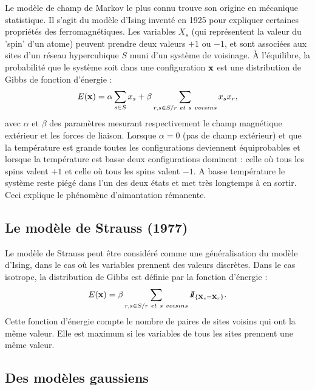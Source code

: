 

\begin{ex}
\cite{Billoire1992}
Le mod\`ele de champ de Markov le plus connu trouve son origine en
m\'ecanique statistique. Il s'agit du mod\`ele d'Ising invent\'e en 1925
pour expliquer certaines propri\'et\'es des ferromagn\'etiques. Les variables
$X_s$ (qui repr\'esentent la valeur du 'spin' d'un atome) peuvent prendre deux valeurs
$+1$ ou $-1$, et sont associ\'ees aux sites d'un r\'eseau hypercubique $S$ muni
d'un syst\`eme de voisinage. \`A l'\'equilibre, la probabilit\'e que le syst\`eme
soit dans une configuration $\mbox{\bf x}$ est une distribution de Gibbs de fonction
d'\'energie :
\begin{equation}
E(\mbox{\bf x})=\alpha \sum_{s \in S} x_s  +  \beta \sum_{r,s \in S/ r \ et \ s \ voisins} x_s x_r,
\end{equation}
avec $\alpha$ et $\beta$ des param\`etres mesurant respectivement le
champ magn\'etique ext\'erieur et les forces de liaison.
Lorsque $\alpha=0$ (pas de champ ext\'erieur)  et que la temp\'erature est grande 
toutes les configurations
deviennent \'equiprobables et lorsque la temp\'erature est basse deux
configurations dominent : celle o\`u tous les spins valent $+1$ et celle
o\`u tous les spins valent $-1$. A basse temp\'erature le syst\`eme reste
pi\'eg\'e dans l'un des deux \'etats et met tr\`es longtemps \`a en sortir.
Ceci explique le ph\'enom\`ene d'aimantation r\'emanente. 
\end{ex}


\subsection{Le mod\`ele de Strauss (1977)}
Le mod\`ele de Strauss peut \^etre consid\'er\'e
comme une g\'en\'eralisation du mod\`ele d'Ising, dans le cas
o\`u les variables prennent des valeurs discr\`etes. Dans le 
cas isotrope, la distribution de Gibbs est d\'efinie par la
fonction d'\'energie :  
\begin{equation}
E(\mbox{\bf x})=  \beta \sum_{r,s \in S/ r \ et \ s \ voisins} I\!\!I_{\{\mbox{\bf x}_s=\mbox{\bf x}_r\}}.
\end{equation}
Cette fonction d'\'energie compte le nombre de paires de sites voisins qui
ont la m\^eme valeur. Elle est maximum si les variables de tous
les sites prennent une m\^eme valeur. 



\subsection{Des mod\`eles gaussiens}
\label{sec:modelgaussien}

